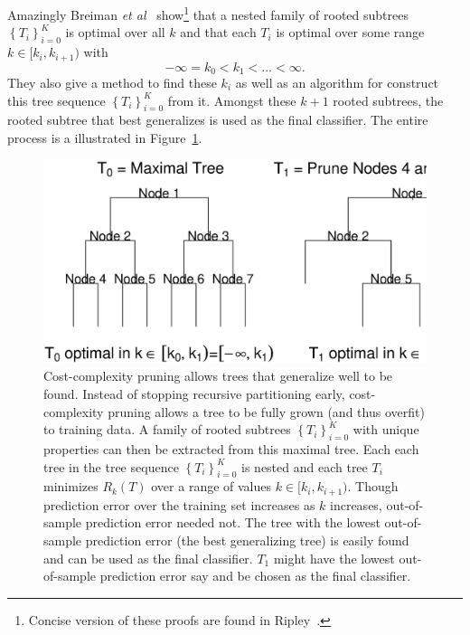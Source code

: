 Amazingly Breiman \emph{et al}~\cite{cart84-2} show\footnote{Concise version of these proofs are found in Ripley~\cite{Ripley.96}.} that a nested family of rooted subtrees $\left\{T_i\right\}_{i=0}^K$ is optimal over all $k$ and that each $T_i$ is optimal over some range $k\in[k_i,k_{i+1})$ with $$-\infty=k_0<k_1<\ldots<\infty.$$ They also give a method to find these $k_i$ as well as an algorithm for construct this tree sequence $\left\{T_i\right\}_{i=0}^K$ from it. Amongst these $k+1$ rooted subtrees, the rooted subtree that best generalizes is used as the final classifier. The entire process is a illustrated in Figure~\ref{fig_tree_pruning}. 
\begin{figure}
\centering
\includegraphics[width=1\textwidth]{fig_tree_pruning.ps}
\caption{Cost-complexity pruning allows trees that generalize well to be found. Instead of stopping recursive partitioning early, cost-complexity pruning allows a tree to be fully grown (and thus overfit) to training data. A family of rooted subtrees $\left\{T_i\right\}_{i=0}^K$ with unique properties can then be extracted from this maximal tree. Each each tree in the tree sequence $\left\{T_i\right\}_{i=0}^K$ is nested and each tree $T_i$ minimizes $R_k(T)$ over a range of values $k\in[k_i,k_{i+1})$. Though prediction error over the training set increases as $k$ increases, out-of-sample prediction error needed not. The tree with the lowest out-of-sample prediction error (the best generalizing tree) is easily found and can be used as the final classifier. $T_1$ might have the lowest out-of-sample prediction error say and be chosen as the final classifier.}
\label{fig_tree_pruning}
\end{figure}

